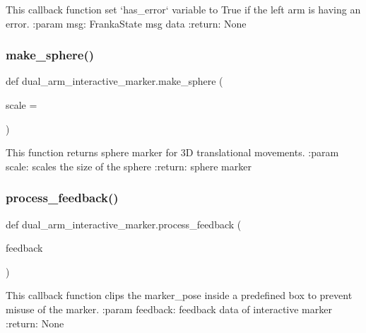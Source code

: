 \begin{DoxyVerb}This callback function set `has_error` variable to True if the left arm is having an error.
:param msg: FrankaState msg data
:return:  None
\end{DoxyVerb}
 \mbox{\label{namespacedual__arm__interactive__marker_a4a4776e18d30b02fcd5aa69cea3e7f87}} 
\subsubsection{\texorpdfstring{make\+\_\+sphere()}{make\_sphere()}}
{\footnotesize\ttfamily def dual\+\_\+arm\+\_\+interactive\+\_\+marker.\+make\+\_\+sphere (\begin{DoxyParamCaption}\item[{}]{scale = {} }\end{DoxyParamCaption})}

\begin{DoxyVerb}This function returns sphere marker for 3D translational movements.
:param scale: scales the size of the sphere
:return: sphere marker
\end{DoxyVerb}
 \mbox{\label{namespacedual__arm__interactive__marker_afedda6582fc6f2b0bd5c4c1e16dc9251}} 
\subsubsection{\texorpdfstring{process\+\_\+feedback()}{process\_feedback()}}
{\footnotesize\ttfamily def dual\+\_\+arm\+\_\+interactive\+\_\+marker.\+process\+\_\+feedback (\begin{DoxyParamCaption}\item[{}]{feedback }\end{DoxyParamCaption})}

\begin{DoxyVerb}This callback function clips the marker_pose inside a predefined box to prevent misuse of the marker.
:param feedback: feedback data of interactive marker
:return: None
\end{DoxyVerb}
 \mbox{\label{namespacedual__arm__interactive__marker_afe5736dcfad3f21203ce12db0eaf6c87}} 
